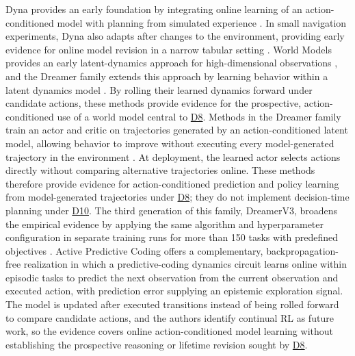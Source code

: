 \documentclass[10pt,journal,compsoc]{IEEEtran}
\DeclareRobustCommand{\Dref}[1]{\hyperref[sec:d#1]{D#1}}
\begin{document}
Dyna provides an early foundation by integrating online learning of an action-conditioned model with planning from simulated experience \cite{sutton1990}.
In small navigation experiments, Dyna also adapts after changes to the environment, providing early evidence for online model revision in a narrow tabular setting \cite{sutton1990}.
World Models provides an early latent-dynamics approach for high-dimensional observations \cite{ha2018}, and the Dreamer family extends this approach by learning behavior within a latent dynamics model \cite{hafner2020,hafner2021,hafner2025}.
By rolling their learned dynamics forward under candidate actions, these methods provide evidence for the prospective, action-conditioned use of a world model central to \Dref{8}.
Methods in the Dreamer family train an actor and critic on trajectories generated by an action-conditioned latent model, allowing behavior to improve without executing every model-generated trajectory in the environment \cite{hafner2020}.
At deployment, the learned actor selects actions directly without comparing alternative trajectories online.
These methods therefore provide evidence for action-conditioned prediction and policy learning from model-generated trajectories under \Dref{8}; they do not implement decision-time planning under \Dref{10}.
The third generation of this family, DreamerV3, broadens the empirical evidence by applying the same algorithm and hyperparameter configuration in separate training runs for more than 150 tasks with predefined objectives \cite{hafner2025}.
Active Predictive Coding \cite{ororbia2023} offers a complementary, backpropagation-free realization in which a predictive-coding dynamics circuit learns online within episodic tasks to predict the next observation from the current observation and executed action, with prediction error supplying an epistemic exploration signal.
The model is updated after executed transitions instead of being rolled forward to compare candidate actions, and the authors identify continual RL as future work, so the evidence covers online action-conditioned model learning without establishing the prospective reasoning or lifetime revision sought by \Dref{8}.
\end{document}

